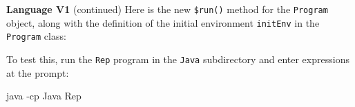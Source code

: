 \begin{minipage}[t]{\sw}
\slidenumber
\LARGE
{\bf Language V1} (continued)\exx
Here is the new \verb'$run()' method for the \verb'Program' object,
along with the definition
of the initial environment \verb'initEnv' in the \verb'Program' class:
{\Large
{}
}
To test this, run the \verb'Rep' program in the \verb'Java' subdirectory
and enter expressions at the prompt:
\begin{qv}
java -cp Java Rep
\end{qv}
\end{minipage}
\clearpage
